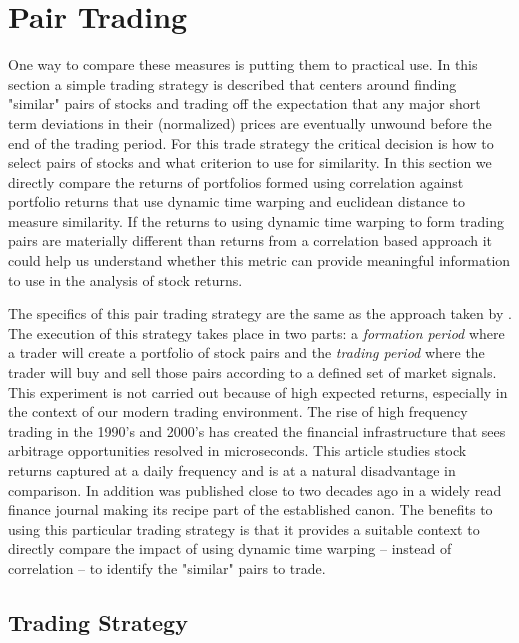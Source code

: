 \documentclass[12pt]{article}
\begin{document}
\section{Pair Trading} \label{sec:PairTrading}


One way to compare these measures is putting them to practical use. In this section a simple trading strategy is described that centers around finding "similar" pairs of stocks and trading off the expectation that any major short term deviations in their (normalized) prices are eventually unwound before the end of the trading period. For this trade strategy the critical decision is how to select pairs of stocks and what criterion to use for similarity. In this section we directly compare the returns of portfolios formed using correlation against portfolio returns that use dynamic time warping and euclidean distance to measure similarity. If the returns to using dynamic time warping to form trading pairs are materially different than returns from a correlation based approach it could help us understand whether this metric can provide meaningful information to use in the analysis of stock returns.

The specifics of this pair trading strategy are the same as the approach taken by \cite{Gatev_et_al_2006}. The execution of this strategy takes place in two parts: a \textit{formation period} where a trader will create a portfolio of stock pairs and the \textit{trading period} where the trader will buy and sell those pairs according to a defined set of market signals. This experiment is not carried out because of high expected returns, especially in the context of our modern trading environment. The rise of high frequency trading in the 1990's and 2000's has created the financial infrastructure that sees arbitrage opportunities resolved in microseconds\parencite{Aquilina_et_al_2021}. This article studies stock returns captured at a daily frequency and is at a natural disadvantage in comparison. In addition \cite{Gatev_et_al_2006} was published close to two decades ago in a widely read finance journal making its recipe part of the established canon. The benefits to using this particular trading strategy is that it provides a suitable context to directly compare the impact of using dynamic time warping -- instead of correlation -- to identify the "similar" pairs to trade.

\subsection{Trading Strategy}
\end{document}
